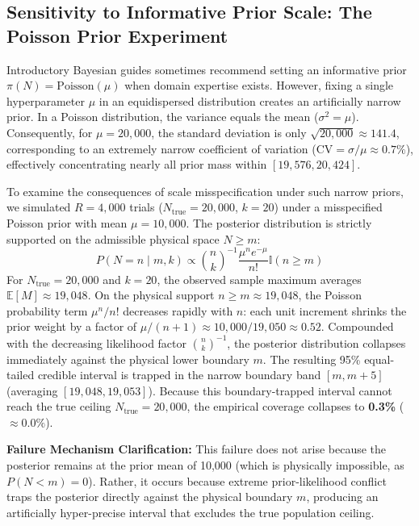 \documentclass[10pt,a4paper]{article}
\begin{document}
\subsection{Sensitivity to Informative Prior Scale: The Poisson Prior Experiment}
\label{sec:informative_trap}
Introductory Bayesian guides sometimes recommend setting an informative prior $\pi(N) = \text{Poisson}(\mu)$ when domain expertise exists. However, fixing a single hyperparameter $\mu$ in an equidispersed distribution creates an artificially narrow prior. In a Poisson distribution, the variance equals the mean ($\sigma^2 = \mu$). Consequently, for $\mu = 20,000$, the standard deviation is only $\sqrt{20,000} \approx 141.4$, corresponding to an extremely narrow coefficient of variation ($\text{CV} = \sigma / \mu \approx 0.7\%$), effectively concentrating nearly all prior mass within $[19,576, 20,424]$.

To examine the consequences of scale misspecification under such narrow priors, we simulated $R = 4,000$ trials ($N_{\text{true}} = 20,000$, $k = 20$) under a misspecified Poisson prior with mean $\mu = 10,000$. The posterior distribution is strictly supported on the admissible physical space $N \ge m$:
\begin{equation}
P(N = n \mid m, k) \propto \binom{n}{k}^{-1} \frac{\mu^n e^{-\mu}}{n!} \mathbb{I}(n \ge m)
\end{equation}
For $N_{\text{true}} = 20,000$ and $k = 20$, the observed sample maximum averages $\mathbb{E}[M] \approx 19,048$. On the physical support $n \ge m \approx 19,048$, the Poisson probability term $\mu^n / n!$ decreases rapidly with $n$: each unit increment shrinks the prior weight by a factor of $\mu / (n+1) \approx 10,000 / 19,050 \approx 0.52$. Compounded with the decreasing likelihood factor $\binom{n}{k}^{-1}$, the posterior distribution collapses immediately against the physical lower boundary $m$. The resulting 95\% equal-tailed credible interval is trapped in the narrow boundary band $[m, m+5]$ (averaging $[19,048, 19,053]$). Because this boundary-trapped interval cannot reach the true ceiling $N_{\text{true}} = 20,000$, the empirical coverage collapses to \textbf{0.3\%} ($\approx 0.0\%$).

\textbf{Failure Mechanism Clarification:} This failure does not arise because the posterior remains at the prior mean of 10,000 (which is physically impossible, as $P(N < m) = 0$). Rather, it occurs because extreme prior-likelihood conflict traps the posterior directly against the physical boundary $m$, producing an artificially hyper-precise interval that excludes the true population ceiling.
\end{document}
